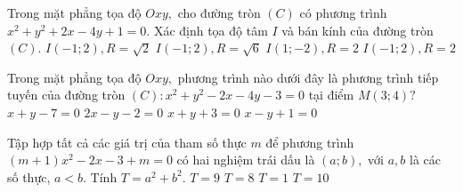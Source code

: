 \begin{ex}%
			Trong mặt phẳng tọa độ $ Oxy, $ cho đường tròn $ (C) $ có phương trình $ x^2+y^2+2x-4y+1=0. $ Xác định tọa độ tâm $ I $ và bán kính của đường tròn $ (C). $
	\choice
	{$ I(-1;2), R=\sqrt{2} $}
	{$ I(-1;2), R=\sqrt{6} $}
	{$ I(1;-2), R=2 $}
	{\True $ I(-1;2), R=2 $}
\end{ex}
\begin{ex}%
			Trong mặt phẳng tọa độ $ Oxy, $ phương trình nào dưới đây là phương trình tiếp tuyến của đường tròn $ (C): x^2+y^2-2x-4y-3=0 $ tại điểm $ M(3;4) ? $
	\choice
	{\True $ x+y-7=0 $}
	{$ 2x-y-2=0 $}
	{$ x+y+3=0 $}
	{$ x-y+1=0 $}
\end{ex}
\begin{ex}%
	Tập hợp tất cả các giá trị của tham số thực $ m $ để phương trình $ (m+1)x^2-2x-3+m=0 $ có hai nghiệm trái dấu là $ (a;b), $ với $ a, b $ là các số thực, $ a<b. $ Tính $ T=a^2+b^2. $
	\choice
	{$ T=9 $}
	{$ T=8$}
	{$ T=1 $}
	{\True $ T=10 $}
\end{ex}
